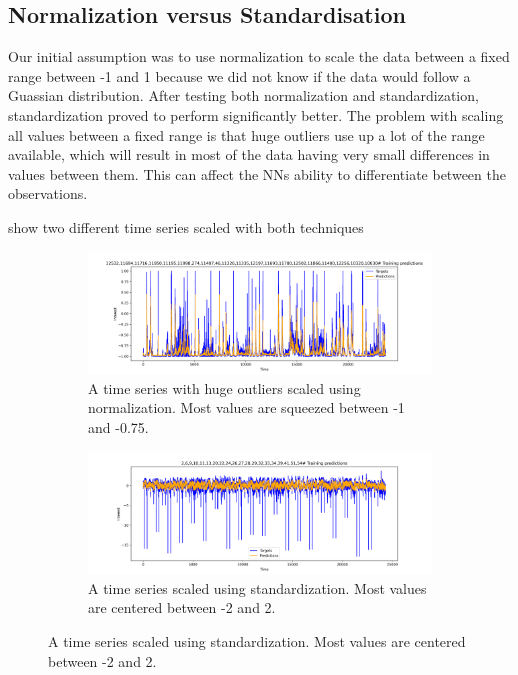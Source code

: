 
\subsection{Normalization versus Standardisation}
Our initial assumption was to use normalization to scale the data between a
fixed range between -1 and 1 because we did not know if the data would follow a Guassian
distribution. After testing both normalization and standardization,
standardization proved to perform significantly better.
The problem with scaling all values between a fixed range is that huge
outliers use up a lot of the range available, which will result in
most of the data having very small differences in values between them.
This can affect the NNs ability to differentiate between the observations.

 show two different time series
scaled with both techniques
\begin{figure}[h!]
  \centering
  \caption{Effects of different scaling techniques on a dataset with huge outliers.}
  \label{fig:time-series-standardization-vs-normalization}
  \begin{subfigure}[b]{0.49\textwidth}
    \includegraphics[width=\textwidth]{./figs/dataset/time-series_scaled_normalization2.png}
    \hfill
    \caption{A time series with huge outliers scaled using normalization. Most values are squeezed between -1 and -0.75.}
    \label{fig:time-series-normalization}
  \end{subfigure}
  \begin{subfigure}[b]{0.49\textwidth}
    \includegraphics[width=\textwidth]{./figs/dataset/time-series_scaled_standardization.png}
    \hfill
    \caption{A time series scaled using standardization. Most values are centered between -2 and 2.}
    \label{fig:time-series-standardization}
  \end{subfigure}
\end{figure}
